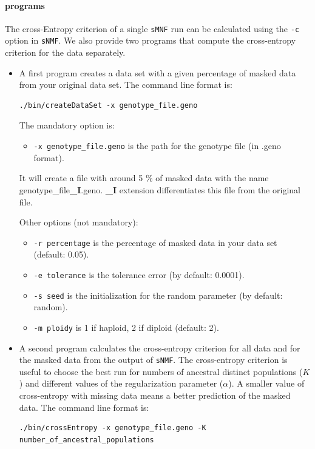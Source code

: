 \documentclass[10pt,a4paper]{article}
\begin{document}
\paragraph{programs}
The cross-Entropy criterion of a single {\tt sMNF} run can be calculated using the \verb|-c| option in {\tt sNMF}. 
We also provide two programs that compute the cross-entropy criterion for the data separately. 
\begin{itemize}
\item A first program creates a data set with a given percentage of masked data from your original data set.
The command line format is:
\begin{Verbatim}[frame=single]
./bin/createDataSet -x genotype_file.geno
\end{Verbatim}

The mandatory option is:
\begin{itemize}
\item \verb|-x genotype_file.geno| is the path for the genotype file (in .geno format).
\end{itemize}

It will create a file with around 5 \% of masked data with the name genotype\_file{\bf\_I}.geno. {\bf\_I} extension differentiates this file from the original file. 

\noindent
Other options (not mandatory):
\begin{itemize}
\item \verb|-r percentage| is the percentage of masked data in your data set (default: 0.05). 
\item \verb|-e tolerance| is the tolerance error (by default: 0.0001). 
\item \verb|-s seed| is the initialization for the random parameter (by default: random). 
\item \verb|-m ploidy| is 1 if haploid, 2 if diploid (default: 2). 
\end{itemize}

\item A second program calculates the cross-entropy criterion for all data and for the masked data from the 
output of {\tt sNMF}. The cross-entropy criterion is useful to choose the best run for numbers of 
ancestral distinct populations ($K$) and different values of the regularization parameter ($\alpha$). 
A smaller value of cross-entropy with missing data means a better prediction of the masked data.
The command line format is:
\begin{Verbatim}[frame=single]
./bin/crossEntropy -x genotype_file.geno -K number_of_ancestral_populations
\end{Verbatim}


\end{itemize}
\end{document}
